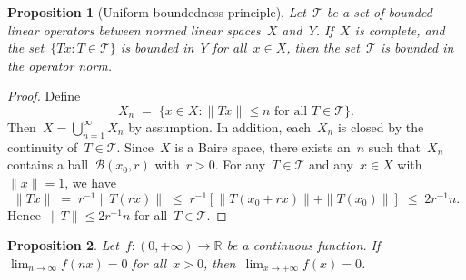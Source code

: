 \documentclass[11pt,a4paper]{article}  %
\newtheorem{proposition}{Proposition}[section]
\theoremstyle{definition}
\def\real{\mathbb{R}}
\newcommand{\TT}{\mathcal{T}}
\newcommand{\BB}{\mathcal{B}}
\numberwithin{equation}{section}
\begin{document}
\begin{proposition}[Uniform boundedness principle]
    \label{prop:ub}
    Let~$\TT$ be a set of bounded linear operators between normed linear spaces~$X$ and~$Y$.
    If~$X$ is complete, and the set~$\{Tx \mathrel{:} T\in \TT\}$ is bounded in~$Y$ for all~$x\in X$,
    then the set~$\TT$ is bounded in the operator norm.
\end{proposition}

\begin{proof}
    Define
    \[
        X_n \;=\; \{x\in X \mathrel{:}  \|Tx\| \le n \text{ for all } T \in \TT\}.
    \]
    Then~$X = \bigcup_{n=1}^\infty X_n$ by assumption.  In addition, each~$X_n$ is closed by the
    continuity of~$T \in \TT$. Since~$X$ is a Baire space, there exists an~$n$ such that~$X_n$
    contains a ball~$\BB(x_0, r)$ with~$r>0$. For any~$T\in\TT$ and any~$x \in X$ with~$\|x\| = 1$, we have
    \[
        \|Tx\| \;=\; r^{-1}\|T(rx)\| \;\le\; r^{-1}\left[\|T(x_0 + rx)\| + \|T(x_0)\|\right] \;\le\; 2r^{-1} n.
    \]
    Hence~$\|T\|\le 2r^{-1}n$ for all~$T\in\TT$.
\end{proof}

\begin{proposition}
    \label{prop:nx}
  Let~$f\mathrel{:} (0,+\infty)\to \real$ be a continuous function. If~$\lim_{n\to \infty}f(nx) = 0$
   for all~$x>0$, then~$\lim_{x\to +\infty} f(x) = 0$.
\end{proposition}
\end{document}
